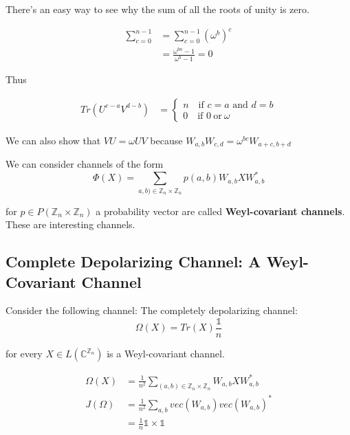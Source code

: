 \documentclass{article}
\begin{document}
        There's an easy way to see why the sum of all the roots of unity is zero.

        \begin{align*}
            \sum_{c=0}^{n-1} &= \sum_{c=0}^{n-1} \left( \omega^b \right)^c \\
            &= \frac{\omega^{bn}-1}{\omega^b-1} = 0
        \end{align*}
       
        Thus

        \begin{align}
            Tr(U^{c-a} V^{d-b}) &= \begin{cases} n \quad \text{if $c=a$ and
    $d=b$} \\ 0 \quad \text{if $0 ~ \text{or} ~ \omega$} \end{cases}
        \end{align}
    
        We can also show that $ VU = \omega UV $ because $ W_{a,b} W_{c,d} =
        \omega^{bc} W_{a+c,b+d} $

        We can consider channels of the form
        \[ 
                \Phi(X) = \sum_{a,b) \in \mathbb{Z}_n \times \mathbb{Z}_n}
                p(a,b) W_{a,b} X W_{a,b}^*
        \]
       
        for $p \in P(\mathbb{Z}_n \times \mathbb{Z}_n)$ a probability vector are
        called \textbf{Weyl-covariant channels}. These are interesting channels. 
        
        \subsection*{Complete Depolarizing Channel: A Weyl-Covariant
        Channel}

        Consider the following channel: The completely depolarizing channel:
        \[ 
                \Omega(X) = Tr(X) \frac{\mathds{1}}{n}
        \]
        
        for every $ X \in L(\mathbb{C}^{\mathbb{Z}_n})$ is a Weyl-covariant
        channel.

        \begin{align*}
            \Omega(X)  &= \frac{1}{n^2} \sum_{(a,b) \in \mathbb{Z}_n \times
            \mathbb{Z}_n} W_{a,b} X W_{a,b}^* \\
            J(\Omega) &= \frac{1}{n^2} \sum_{a,b} vec(W_{a,b}) vec(W_{a,b})^* \\
                      &= \frac{1}{n} \mathds{1} \times \mathds{1}
        \end{align*}
        
\end{document}
